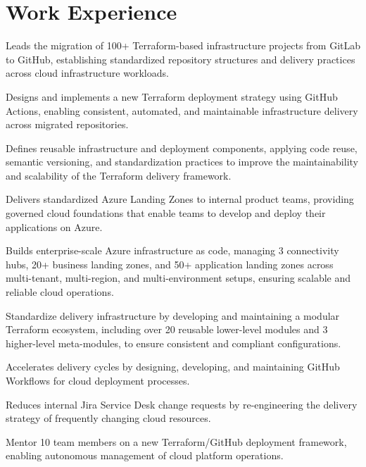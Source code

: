\documentclass[11pt]{deedy-resume-openfont}
\begin{document}
\section{Work Experience}
\sectionsepsmall
{}\hfill {}
\begin{tightemize}
	\item Leads the migration of 100+ Terraform-based infrastructure projects from GitLab to GitHub, establishing standardized repository structures and delivery practices across cloud infrastructure workloads.
	\item Designs and implements a new Terraform deployment strategy using GitHub Actions, enabling consistent, automated, and maintainable infrastructure delivery across migrated repositories.
	\item Defines reusable infrastructure and deployment components, applying code reuse, semantic versioning, and standardization practices to improve the maintainability and scalability of the Terraform delivery framework.
	\item Delivers standardized Azure Landing Zones to internal product teams, providing governed cloud foundations that enable teams to develop and deploy their applications on Azure.
\end{tightemize}
\sectionsep
{}
\sectionsep
{}\hfill {}
\begin{tightemize}
	\item Builds enterprise-scale Azure infrastructure as code, managing 3 connectivity hubs, 20+ business landing zones, and 50+ application landing zones across multi-tenant, multi-region, and multi-environment setups, ensuring scalable and reliable cloud operations.
	\item Standardize delivery infrastructure by developing and maintaining a modular Terraform ecosystem, including over 20 reusable lower-level modules and 3 higher-level meta-modules, to ensure consistent and compliant configurations.
	\item Accelerates delivery cycles by designing, developing, and maintaining GitHub Workflows for cloud deployment processes.
	\item Reduces internal Jira Service Desk change requests by re-engineering the delivery strategy of frequently changing cloud resources.
	\item Mentor 10 team members on a new Terraform/GitHub deployment framework, enabling autonomous management of cloud platform operations.
\end{tightemize}
\sectionsep
{}
\newpage
\end{document}
